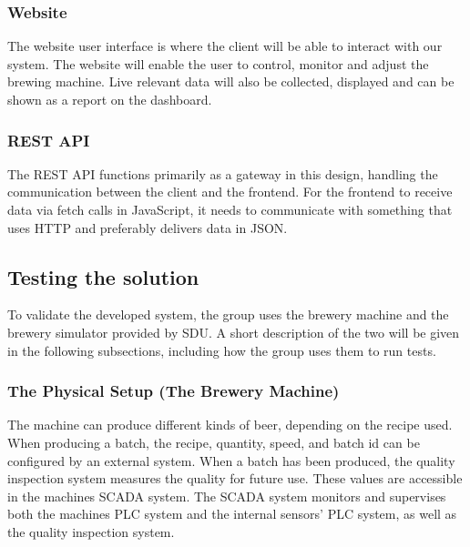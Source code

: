 \subsubsection{Website}
The website user interface is where the client will be able to interact with
our system. The website will enable the user to control, monitor and adjust
the brewing machine. Live relevant data will also be collected, displayed and
can be shown as a report on the dashboard.


\subsubsection{REST API}
The REST API functions primarily as a gateway in this design, handling the
communication between the client and the frontend. For the
frontend to receive data via fetch calls in JavaScript, it needs to communicate 
with something that uses HTTP and preferably delivers data in JSON.


\subsection{Testing the solution}
To validate the developed system, the group uses the brewery machine and the
brewery simulator provided by SDU. A short description of the two will be given
in the following subsections, including how the group uses them to run tests.

\subsubsection{The Physical Setup (The Brewery Machine)}
The machine can produce different kinds of beer, depending on the recipe used.
When producing a batch, the recipe, quantity, speed, and batch id can be
configured by an external system. When a batch has been produced, the quality
inspection system measures the quality for future use. These values are
accessible in the machines SCADA system. The SCADA system monitors and
supervises both the machines PLC system and the internal sensors' PLC system,
as well as the quality inspection system.\\

